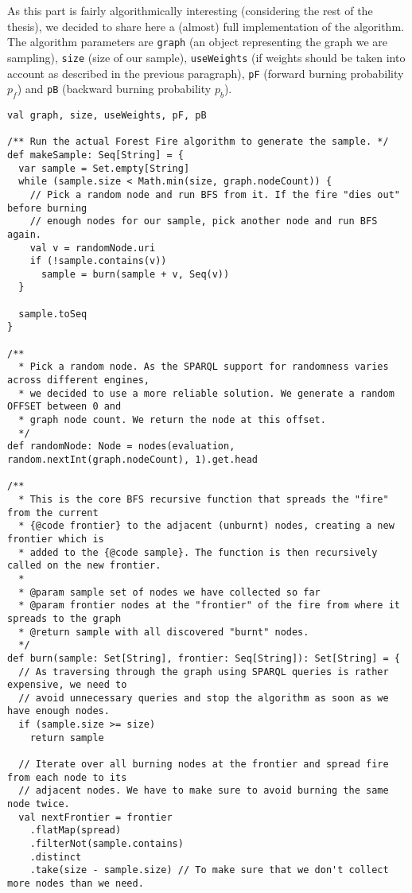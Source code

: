As this part is fairly algorithmically interesting (considering the rest of the thesis), we decided to share here a (almost) full implementation of the algorithm. The algorithm parameters are \texttt{graph} (an object representing the graph we are sampling), \texttt{size} (size of our sample), \texttt{useWeights} (if weights should be taken into account as described in the previous paragraph), \texttt{pF} (forward burning probability $p_f$) and \texttt{pB} (backward burning probability $p_b$).

\begin{verbatim}
val graph, size, useWeights, pF, pB

/** Run the actual Forest Fire algorithm to generate the sample. */
def makeSample: Seq[String] = {
  var sample = Set.empty[String]
  while (sample.size < Math.min(size, graph.nodeCount)) {
    // Pick a random node and run BFS from it. If the fire "dies out" before burning
    // enough nodes for our sample, pick another node and run BFS again.
    val v = randomNode.uri
    if (!sample.contains(v))
      sample = burn(sample + v, Seq(v))
  }

  sample.toSeq
}

/**
  * Pick a random node. As the SPARQL support for randomness varies across different engines,
  * we decided to use a more reliable solution. We generate a random OFFSET between 0 and
  * graph node count. We return the node at this offset.
  */
def randomNode: Node = nodes(evaluation, random.nextInt(graph.nodeCount), 1).get.head

/**
  * This is the core BFS recursive function that spreads the "fire" from the current
  * {@code frontier} to the adjacent (unburnt) nodes, creating a new frontier which is
  * added to the {@code sample}. The function is then recursively called on the new frontier.
  *
  * @param sample set of nodes we have collected so far
  * @param frontier nodes at the "frontier" of the fire from where it spreads to the graph
  * @return sample with all discovered "burnt" nodes.
  */
def burn(sample: Set[String], frontier: Seq[String]): Set[String] = {
  // As traversing through the graph using SPARQL queries is rather expensive, we need to
  // avoid unnecessary queries and stop the algorithm as soon as we have enough nodes.
  if (sample.size >= size)
    return sample

  // Iterate over all burning nodes at the frontier and spread fire from each node to its
  // adjacent nodes. We have to make sure to avoid burning the same node twice.
  val nextFrontier = frontier
    .flatMap(spread)
    .filterNot(sample.contains)
    .distinct
    .take(size - sample.size) // To make sure that we don't collect more nodes than we need.


\end{verbatim}
